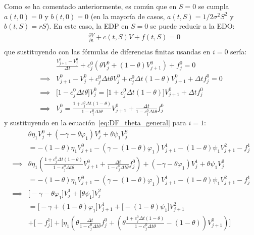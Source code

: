 Como se ha comentado anteriormente, es común que en $S=0$ se cumpla $a(t,0)=0$ y $b(t,0)=0$ (en la mayoría de casos, $a(t,S)=1/2\sigma^2S^2$ y $b(t,S)=rS$). En este caso, la EDP en $S=0$ se puede reducir a la EDO:\@
\begin{align*}
    &\frac{\partial V}{\partial t} + c(t, S) V + f(t, S) = 0 \\
\end{align*}
que sustituyendo con las fórmulas de diferencias finitas usandas en $i=0$ sería:
\begin{align*}
    &\frac{V_{j+1}^0 - V_j^0}{\Delta t} + c_j^0 \left( \theta V_j^0 + (1-\theta) V_{j+1}^0 \right) + f_j^0 = 0 \\
    \implies &V_{j+1}^0 - V_j^0 + c_j^0 \Delta t \theta V_j^0 + c_j^0 \Delta t (1-\theta) V_{j+1}^0 + \Delta t f_j^0 = 0 \\
    \implies &\bigg[ 1 - c_j^0 \Delta t \theta \bigg] V_j^0 = \bigg[ 1 + c_j^0 \Delta t (1-\theta) \bigg] V_{j+1}^0 + \Delta t f_j^0 \\
    \implies &V_j^0 = \frac{1 + c_j^0 \Delta t (1-\theta)}{1 - c_j^0 \Delta t \theta} V_{j+1}^0 + \frac{\Delta t}{1 - c_j^0 \Delta t \theta} f_j^0
\end{align*}
y sustituyendo en la ecuación~\eqref{eq:DF_theta_general} para $i=1$:
\begin{align*}
    &\theta\eta_1 V_j^{0} +\left( -\gamma - \theta \varphi_1 \right)V_j^1 +\theta\psi_1 V_j^{2} \\
    &= - (1-\theta)\eta_1 V_{j+1}^{0} -\left( \gamma - (1-\theta) \varphi_1 \right)V_{j+1}^1 - (1-\theta)\psi_1 V_{j+1}^{2} - f_j^1 \\
    \implies &\theta\eta_1 \left( \frac{1 + c_j^0 \Delta t (1-\theta)}{1 - c_j^0 \Delta t \theta} V_{j+1}^0 + \frac{\Delta t}{1 - c_j^0 \Delta t \theta} f_j^0 \right) +\left( -\gamma - \theta \varphi_1 \right)V_j^1 +\theta\psi_1 V_j^{2} \\
    &= - (1-\theta)\eta_1 V_{j+1}^{0} -\left( \gamma - (1-\theta) \varphi_1 \right)V_{j+1}^1 - (1-\theta)\psi_1 V_{j+1}^{2} - f_j^1 \\
    \implies &\bigg[ -\gamma - \theta \varphi_1 \bigg]V_j^1 + \bigg[ \theta \psi_1 \bigg]V_j^{2} \\
    &= \bigg[ - \gamma + (1-\theta) \varphi_1 \bigg]V_{j+1}^1 + \bigg[ - (1-\theta)\psi_1 \bigg]V_{j+1}^{2} \\
    &+ \bigg[- f_j^1 \bigg] + \bigg[ \eta_1 \left( \theta\frac{\Delta t}{1 - c_j^0 \Delta t \theta} f_j^0 + \left( \theta \frac{1 + c_j^0 \Delta t (1-\theta)}{1 - c_j^0 \Delta t \theta} - (1-\theta) \right) V_{j+1}^{0} \right) \bigg] \\
\end{align*}
